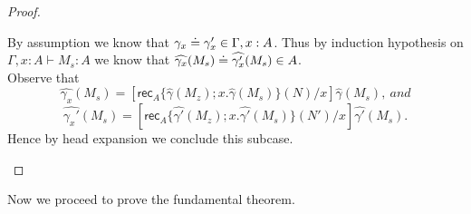 \documentclass{article}
\newcommand{\G}{\Gamma}
\newcommand{\entails}{\vdash}
\newcommand{\erec}[5]{\mathsf{rec}_{#1}\{#2;#3.#4\}(#5)}
\begin{document}
\begin{proof}
\begin{itemize}
\begin{itemize}
        By assumption we know that $\gamma_x \eeq \gamma_x' \in \G,x:A$.
        Thus by induction hypothesis on $\G,x:A \entails M_s : A$ we know that $\widehat{\gamma_x}(M_s) \doteq \widehat{\gamma_x'}(M_s) \in A$.\\
        Observe that $$\widehat{\gamma_x}(M_s) = [\erec{A}{\widehat{\gamma}(M_z)}{x}{\widehat{\gamma}(M_s)}{N}/x]\widehat{\gamma}(M_s), \ and$$ $$\widehat{\gamma_x'}(M_s) = [\erec{A}{\widehat{\gamma'}(M_z)}{x}{\widehat{\gamma'}(M_s)}{N'}/x]\widehat{\gamma'}(M_s).$$
        Hence by head expansion we conclude this subcase.
    \end{itemize}
\end{itemize}
\end{proof}

Now we proceed to prove the fundamental theorem.
\end{document}
